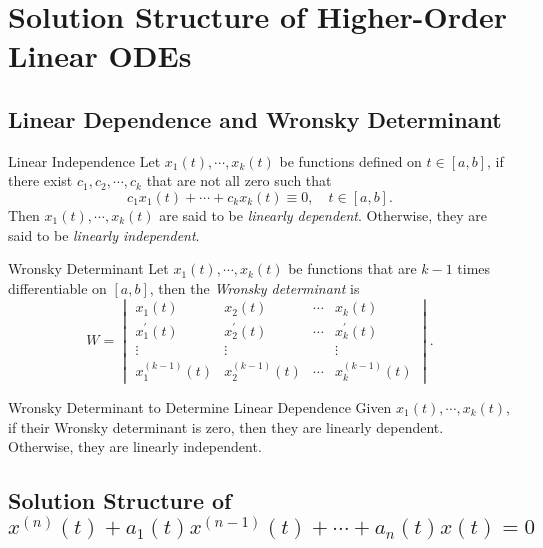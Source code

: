 
\section{Solution Structure of Higher-Order Linear ODEs}

\subsection{Linear Dependence and Wronsky Determinant}

\begin{definition}{Linear Independence}{}
  Let $x_1(t),\cdots,x_k(t)$ be functions defined on $t \in [a, b]$,
  if there exist $c_1,c_2,\cdots,c_k$ that are not all zero such that
  \begin{equation}
    c_1x_1(t) + \cdots + c_kx_k(t) \equiv 0, \quad t \in [a, b].
  \end{equation}
  Then $x_1(t), \cdots, x_k(t)$ are said to be \emph{linearly dependent}.
  Otherwise, they are said to be \emph{linearly independent}.
\end{definition}

\begin{definition}{Wronsky Determinant}{}
  Let $x_1(t),\cdots,x_k(t)$ be functions that are $k-1$ times differentiable on $[a, b]$,
  then the \emph{Wronsky determinant} is
  \begin{equation}
    W =
    \begin{vmatrix}
      x_1(t) & x_2(t) & \cdots & x_k(t)\\
      x^{\prime}_1(t) & x^{\prime}_2(t) & \cdots & x^{\prime}_k(t)\\
      \vdots & \vdots & & \vdots\\
      x^{(k-1)}_1(t) & x^{(k-1)}_2(t) & \cdots & x^{(k-1)}_k(t)
    \end{vmatrix}.
  \end{equation}
\end{definition}

\begin{proposition}{Wronsky Determinant to Determine Linear Dependence}{}
  Given $x_1(t),\cdots,x_k(t)$, if their Wronsky determinant is zero,
  then they are linearly dependent. Otherwise, they are linearly independent.
\end{proposition}

\subsection{Solution Structure of $x^{(n)}(t) + a_1(t)x^{(n-1)}(t) + \cdots + a_n(t)x(t) = 0$}

